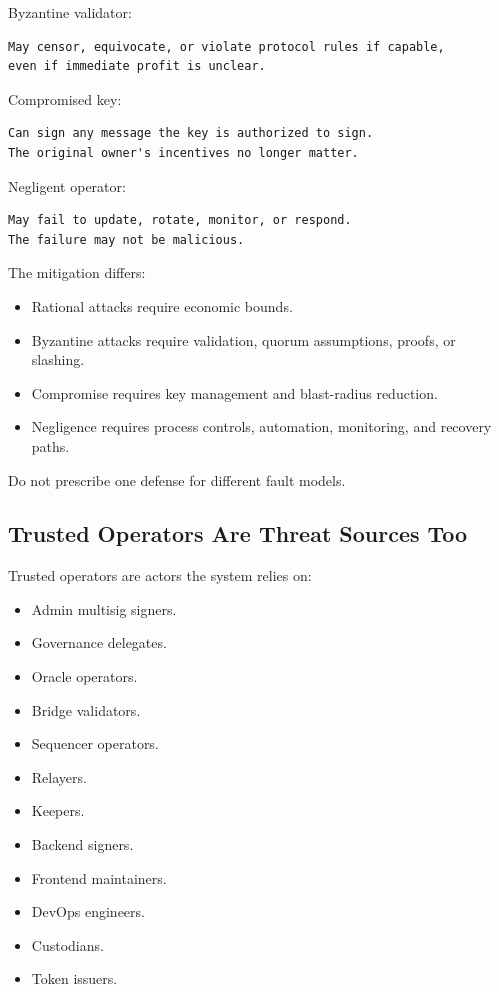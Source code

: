 Byzantine validator:

\begin{lstlisting}
May censor, equivocate, or violate protocol rules if capable,
even if immediate profit is unclear.
\end{lstlisting}

Compromised key:

\begin{lstlisting}
Can sign any message the key is authorized to sign.
The original owner's incentives no longer matter.
\end{lstlisting}

Negligent operator:

\begin{lstlisting}
May fail to update, rotate, monitor, or respond.
The failure may not be malicious.
\end{lstlisting}

The mitigation differs:

\begin{itemize}
\tightlist
\item
  Rational attacks require economic bounds.
\item
  Byzantine attacks require validation, quorum assumptions, proofs, or
  slashing.
\item
  Compromise requires key management and blast-radius reduction.
\item
  Negligence requires process controls, automation, monitoring, and
  recovery paths.
\end{itemize}

Do not prescribe one defense for different fault models.

\subsection{Trusted Operators Are Threat Sources Too}

Trusted operators are actors the system relies on:

\begin{itemize}
\tightlist
\item
  Admin multisig signers.
\item
  Governance delegates.
\item
  Oracle operators.
\item
  Bridge validators.
\item
  Sequencer operators.
\item
  Relayers.
\item
  Keepers.
\item
  Backend signers.
\item
  Frontend maintainers.
\item
  DevOps engineers.
\item
  Custodians.
\item
  Token issuers.
\end{itemize}


